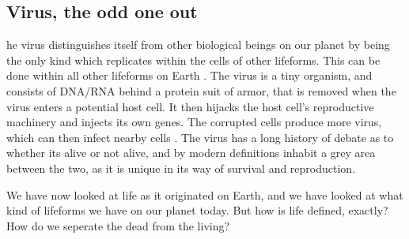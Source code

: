 \subsection{Virus, the odd one out}

he virus distinguishes itself from other biological beings on our planet by being the only kind which replicates within the cells of other lifeforms.
This can be done within all other lifeforms on Earth \cite{koonin}.
The virus is a tiny organism, and consists of DNA/RNA behind a protein suit of armor, that is removed when the virus enters a potential host cell.
It then hijacks the host cell's reproductive machinery and injects its own genes.
The corrupted cells produce more virus, which can then infect nearby cells \cite{villareal}.
The virus has a long history of debate as to whether its alive or not alive, and by modern definitions inhabit a grey area between the two, as it is unique in its way of survival and reproduction.

We have now looked at life as it originated on Earth, and we have looked at what kind of lifeforms we have on our planet today. But how is life defined, exactly? How do we seperate the dead from the living? 